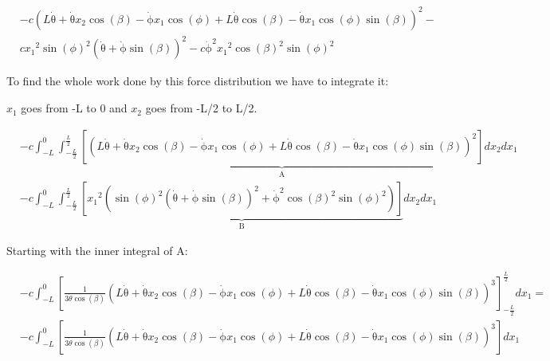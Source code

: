 \subsection{}
\begin{equation}
    \begin{split}
        &-c{\left(L\mathrm{\dot{\theta}}+\mathrm{\dot{\theta}}x_{2}\cos\left(\beta \right)-\mathrm{\dot{\phi}}x_{1}\cos\left(\phi \right)+L\mathrm{\dot{\theta}}\cos\left(\beta \right)-\mathrm{\dot{\theta}}x_{1}\cos\left(\phi \right)\sin\left(\beta \right)\right)}^2-\\
        &c{x_{1}}^2{\sin\left(\phi \right)}^2{\left(\mathrm{\dot{\theta}}+\mathrm{\dot{\phi}}\sin\left(\beta \right)\right)}^2-c{\mathrm{\dot{\phi}}}^2{x_{1}}^2{\cos\left(\beta \right)}^2{\sin\left(\phi \right)}^2 
    \end{split}
\end{equation}

To find the whole work done by this force distribution we have to integrate it:

$x_1$ goes from -L to 0 and $x_2$ goes from -L/2 to L/2.

\begin{equation}
    \begin{split}
        &-c\int_{-L}^0\int_{-\frac{L}{2}}^{\frac{L}{2}}
        \underbrace{\left[{\left(L\mathrm{\dot{\theta}}+\mathrm{\dot{\theta}}x_{2}\cos\left(\beta \right)-\mathrm{\dot{\phi}}x_{1}\cos\left(\phi \right)+L\mathrm{\dot{\theta}}\cos\left(\beta \right)-\mathrm{\dot{\theta}}x_{1}\cos\left(\phi \right)\sin\left(\beta \right)\right)}^2\right]}_{\text{A}}
        dx_2dx_1\\
        &-c\int_{-L}^0\int_{-\frac{L}{2}}^{\frac{L}{2}}
        \underbrace{\left[{x_{1}}^2\left({\sin\left(\phi \right)}^2{\left(\mathrm{\dot{\theta}}+\mathrm{\dot{\phi}}\sin\left(\beta \right)\right)}^2+{\mathrm{\dot{\phi}}}^2{\cos\left(\beta \right)}^2{\sin\left(\phi \right)}^2\right)\right]}_{\text{B}}
         dx_2dx_1
    \end{split}
\end{equation}

Starting with the inner integral of A:

\begin{equation}
    \begin{split}
        &-c\int_{-L}^0
        \left[\frac{1}{3\dot\theta\cos(\beta)}{\left(L\mathrm{\dot{\theta}}+\mathrm{\dot{\theta}}x_{2}\cos\left(\beta \right)-\mathrm{\dot{\phi}}x_{1}\cos\left(\phi \right)+L\mathrm{\dot{\theta}}\cos\left(\beta \right)-\mathrm{\dot{\theta}}x_{1}\cos\left(\phi \right)\sin\left(\beta \right)\right)}^3\right]
        _{-\frac{L}{2}}^\frac{L}{2}dx_1 = \\
        &-c\int_{-L}^0
        \left[\frac{1}{3\dot\theta\cos(\beta)}{\left(L\mathrm{\dot{\theta}}+\mathrm{\dot{\theta}}x_{2}\cos\left(\beta \right)-\mathrm{\dot{\phi}}x_{1}\cos\left(\phi \right)+L\mathrm{\dot{\theta}}\cos\left(\beta \right)-\mathrm{\dot{\theta}}x_{1}\cos\left(\phi \right)\sin\left(\beta \right)\right)}^3\right]
        dx_1
    \end{split}
\end{equation}





    


